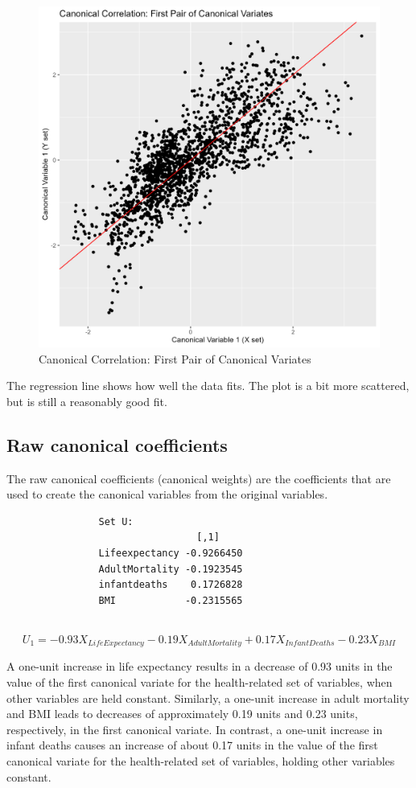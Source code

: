 \documentclass[11pt]{article}
\begin{document}
			\begin{figure}[h]
				\centering
				\includegraphics[width=0.5\linewidth]{../Image/first_cc_plot}
				\caption{Canonical Correlation: First Pair of Canonical Variates}
				\label{fig:firstccplot}
			\end{figure}
			The regression line shows how well the data fits. The plot is a bit more scattered, but is still a reasonably good fit.
						
		
		\subsection{Raw canonical coefficients}
		
		The raw canonical coefficients (canonical weights) are the coefficients that are used to create the canonical variables from the original variables.
		
		\begin{tcolorbox}[colback=white, colframe=white]
			\begin{verbatim}
				Set U:
				                 [,1]        
				Lifeexpectancy -0.9266450  
				AdultMortality -0.1923545  
				infantdeaths    0.1726828  
				BMI            -0.2315565 
				
			\end{verbatim}
		\end{tcolorbox}
		
		\begin{equation}
			U_1 = -0.93 X_{Life Expectancy} - 0.19 X_{Adult Mortality} + 0.17 X_{Infant Deaths} - 0.23 X_{BMI}
		\end{equation}
		
		A one-unit increase in life expectancy results in a decrease of 0.93 units in the value of the first canonical variate for the health-related set of variables, when other variables are held constant. Similarly, a one-unit increase in adult mortality and BMI leads to decreases of approximately 0.19 units and 0.23 units, respectively, in the first canonical variate. In contrast, a one-unit increase in infant deaths causes an increase of about 0.17 units in the value of the first canonical variate for the health-related set of variables, holding other variables constant.
		
\end{document}
